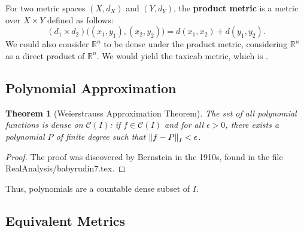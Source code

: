 \documentclass[11pt]{article}
\newtheorem{theorem}{Theorem}
\begin{document}
For two metric spaces $(X, d_{X})$ and $(Y, d_{Y})$, the \textbf{product metric} is a metric over $X \times Y$ defined as follows:
\[
	(d_{1} \times d_{2})\big((x_{1}, y_{1}), (x_{2}, y_{2})\big) = d(x_{1}, x_{2}) + d(y_{1}, y_{2}).
\]
We could also consider $\mathbb{R}^{n}$ to be dense under the product metric, considering $\mathbb{R}^{n}$ as a direct product of $\mathbb{R}^{n}$. We would yield the taxicab metric, which is .


\subsection{Polynomial Approximation}

\begin{theorem}[Weierstrauss Approximation Theorem]
  The set of all polynomial functions is dense on $\mathcal{C}(I)$: if $f \in \mathcal{C}(I)$ and for all $\epsilon > 0$, there exists a polynomial $P$ of finite degree such that $\norm{f - P}_{I} < \epsilon$.
\end{theorem}
\begin{adjustwidth}{0.5cm}{}
  \begin{proof}
    The proof was discovered by Bernstein in the 1910s, found in the file RealAnalysis/babyrudin7.tex.
  \end{proof}
\end{adjustwidth}

Thus, polynomials are a countable dense subset of $I$.


\subsection{Equivalent Metrics}
\end{document}
